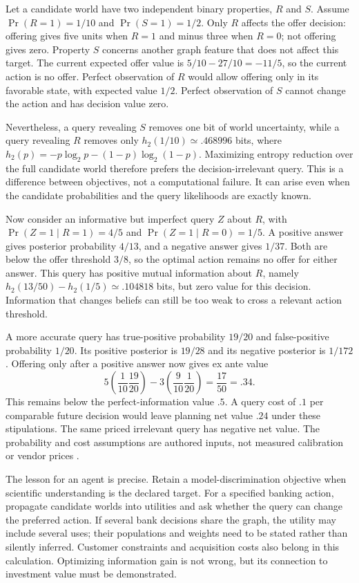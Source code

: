 {Let a candidate world have two independent binary properties, $R$ and $S$.
Assume $\Pr(R=1)=1/10$ and $\Pr(S=1)=1/2$. Only $R$ affects the offer
decision: offering gives five units when $R=1$ and minus three when $R=0$;
not offering gives zero. Property $S$ concerns another graph feature that
does not affect this target. The current expected offer value is
$5/10-27/10=-11/5$, so the current action is no offer. Perfect observation
of $R$ would allow offering only in its favorable state, with expected value
$1/2$. Perfect observation of $S$ cannot change the action and has decision
value zero.

Nevertheless, a query revealing $S$ removes one bit of world uncertainty,
while a query revealing $R$ removes only
$h_2(1/10)\simeq .468996$ bits, where
$h_2(p)=-p\log_2p-(1-p)\log_2(1-p)$. Maximizing entropy reduction over
the full candidate world therefore prefers the decision-irrelevant query.
This is a difference between objectives, not a computational failure. It can
arise even when the candidate probabilities and the query likelihoods are
exactly known.

Now consider an informative but imperfect query $Z$ about $R$, with
$\Pr(Z=1\mid R=1)=4/5$ and $\Pr(Z=1\mid R=0)=1/5$. A positive answer
gives posterior probability $4/13$, and a negative answer gives $1/37$.
Both are below the offer threshold $3/8$, so the optimal action remains no
offer for either answer. This query has positive mutual information about
$R$, namely $h_2(13/50)-h_2(1/5)\simeq .104818$ bits, but zero value
for this decision. Information that changes beliefs can still be too weak to
cross a relevant action threshold.

A more accurate query has true-positive probability $19/20$ and
false-positive probability $1/20$. Its positive posterior is $19/28$ and
its negative posterior is $1/172$. Offering only after a positive answer
now gives ex ante value
\[
 5\left(\frac1{10}\frac{19}{20}\right)
 -3\left(\frac9{10}\frac1{20}\right)
 =\frac{17}{50}=.34.
\]
This remains below the perfect-information value $.5$. A query cost of $.1$
per comparable future decision would leave planning net value $.24$ under
these stipulations. The same priced irrelevant query has negative net value.
The probability and cost assumptions are authored inputs, not measured
calibration or vendor prices \citep{exec14_discovery_screening_value}.

The lesson for an agent is precise. Retain a model-discrimination objective
when scientific understanding is the declared target. For a specified banking
action, propagate candidate worlds into utilities and ask whether the query
can change the preferred action. If several bank decisions share the graph,
the utility may include several uses; their populations and weights need to
be stated rather than silently inferred. Customer constraints and acquisition
costs also belong in this calculation. Optimizing information gain is not
wrong, but its connection to investment value must be demonstrated.

}
